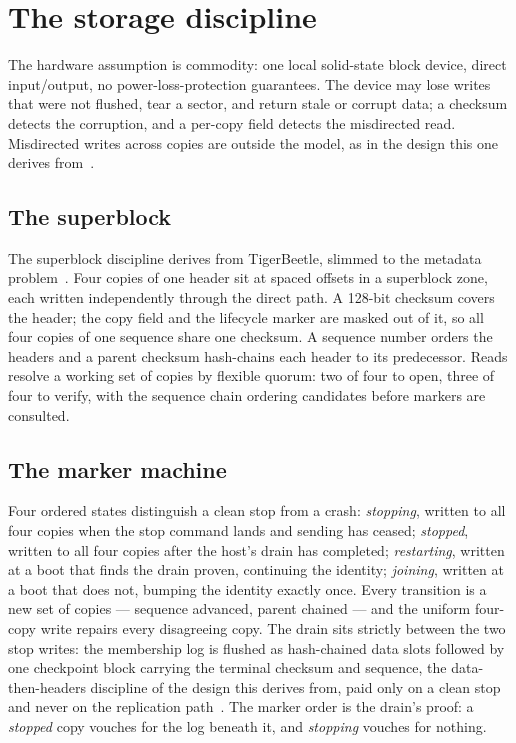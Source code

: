 \documentclass[10pt,journal,letterpaper]{IEEEtran}
\begin{document}
\section{The storage discipline}\label{sec:storage}
The hardware assumption is commodity: one local solid-state block device,
direct input/output, no power-loss-protection guarantees.
The device may lose writes that were not flushed, tear a sector, and return
stale or corrupt data; a checksum detects the corruption, and a per-copy
field detects the misdirected read.
Misdirected writes across copies are outside the model, as in the design this
one derives from~\cite{tigerbeetle}.

\subsection{The superblock}
The superblock discipline derives from TigerBeetle, slimmed to the metadata
problem~\cite{tigerbeetle,artifact}.
Four copies of one header sit at spaced offsets in a superblock zone, each
written independently through the direct path.
A 128-bit checksum covers the header; the copy field and the lifecycle marker
are masked out of it, so all four copies of one sequence share one checksum.
A sequence number orders the headers and a parent checksum hash-chains each
header to its predecessor.
Reads resolve a working set of copies by flexible quorum: two of four to
open, three of four to verify, with the sequence chain ordering candidates
before markers are consulted.

\subsection{The marker machine}
Four ordered states distinguish a clean stop from a crash:
\emph{stopping}, written to all four copies when the stop command lands and
sending has ceased;
\emph{stopped}, written to all four copies after the host's drain has
completed;
\emph{restarting}, written at a boot that finds the drain proven, continuing
the identity;
\emph{joining}, written at a boot that does not, bumping the identity exactly
once.
Every transition is a new set of copies --- sequence advanced, parent
chained --- and the uniform four-copy write repairs every disagreeing copy.
The drain sits strictly between the two stop writes: the membership log is
flushed as hash-chained data slots followed by one checkpoint block carrying
the terminal checksum and sequence, the data-then-headers discipline of the
design this derives from, paid only on a clean stop and never on the
replication path~\cite{tigerbeetle,artifact}.
The marker order is the drain's proof: a \emph{stopped} copy vouches for the
log beneath it, and \emph{stopping} vouches for nothing.
\end{document}
